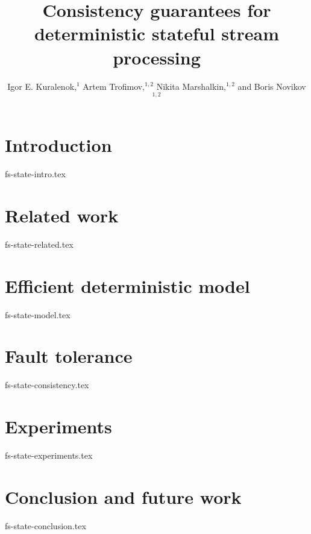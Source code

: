 \documentclass[sigconf]{acmart}
\theoremstyle{remark}
\begin{document}
\title {Consistency guarantees for deterministic stateful stream processing}

\author{  Igor E. Kuralenok,$^1$     Artem Trofimov,$^ {1,2}$    Nikita Marshalkin,$^ {1,2}$   and  Boris Novikov$^ {1,2}$ }

\begin{abstract}
\end{abstract}

\maketitle

\section {Introduction}
 {fs-state-intro.tex}

\section {Related work}
 {fs-state-related.tex}

\section {Efficient deterministic model}
 {fs-state-model.tex}

\section{Fault tolerance}
 {fs-state-consistency.tex}

\section {Experiments}
 {fs-state-experiments.tex}

\section {Conclusion and future work}
 {fs-state-conclusion.tex}



\end{document}
